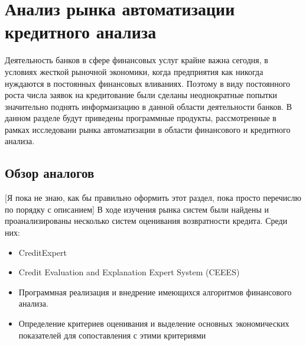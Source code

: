 \section{Анализ рынка автоматизации кредитного анализа}
\label{sec:analysis}

Деятельность банков в сфере финансовых услуг крайне важна сегодня, в условиях жесткой рыночной экономики, когда предприятия как никогда нуждаются в постоянных финансовых вливаниях. Поэтому в виду постоянного роста числа заявок на кредитование были сделаны неоднократные попытки значительно поднять информаизацию в данной области деятельности банков. В данном разделе будут приведены программные продукты, рассмотренные в рамках исследовани рынка автоматизации в области финансового и кредитного анализа.

\subsection{Обзор аналогов}
\label{sec:analysis_analog}

[Я пока не знаю, как бы правильно оформить этот раздел, пока просто перечислю по порядку с описанием]
В ходе изучения рынка систем были найдены и проанализированы несколько систем оценивания возвратности кредита. Среди них:

\begin{itemize}
\item CreditExpert
\item Credit Evaluation and Explanation Expert System (CEEES)
\item Программная реализация и внедрение имеющихся алгоритмов финансового анализа.
\item Определение критериев оценивания и выделение основных экономических показателей для сопоставления с этими критериями
\end{itemize}
